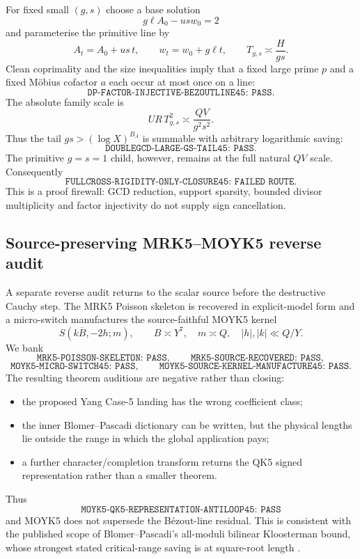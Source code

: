 \documentclass[11pt]{article}
\theoremstyle{definition}
\newcommand{\1}{\mathbf 1}
\begin{document}
For fixed small $(g,s)$ choose a base solution
\[
 g\ell A_0-usw_0=2
\]
and parameterise the primitive line by
\[
 A_t=A_0+us\,t,\qquad
 w_t=w_0+g\ell t,\qquad
 T_{g,s}\asymp \frac{H}{gs}.
\]
Clean coprimality and the size inequalities imply that a fixed large prime
$p$ and a fixed M\"obius cofactor $a$ each occur at most once on a line:
\[
 \boxed{\texttt{DP-FACTOR-INJECTIVE-BEZOUTLINE45: PASS}}.
\]
The absolute family scale is
\[
 UR\,T_{g,s}^2\asymp \frac{QV}{g^2s^2}.
\]
Thus the tail $gs>(\log X)^{B_A}$ is summable with arbitrary logarithmic
saving:
\[
 \boxed{\texttt{DOUBLEGCD-LARGE-GS-TAIL45: PASS}}.
\]
The primitive $g=s=1$ child, however, remains at the full natural $QV$ scale.
Consequently
\[
 \boxed{\texttt{FULLCROSS-RIGIDITY-ONLY-CLOSURE45: FAILED ROUTE}}.
\]
This is a proof firewall: GCD reduction, support sparsity, bounded divisor
multiplicity and factor injectivity do not supply sign cancellation.

\subsection{Source-preserving MRK5--MOYK5 reverse audit}
A separate reverse audit returns to the scalar source before the destructive
Cauchy step.  The MRK5 Poisson skeleton is recovered in explicit-model form
and a micro-switch manufactures the source-faithful MOYK5 kernel
\[
 \boxed{S(k\overline B,-2h;m)},
 \qquad
 B\asymp Y^7,\quad m\asymp Q,\quad |h|,|k|\ll Q/Y.
\]
We bank
\[
 \boxed{\texttt{MRK5-POISSON-SKELETON: PASS}},
 \qquad
 \boxed{\texttt{MRK5-SOURCE-RECOVERED: PASS}},
\]
\[
 \boxed{\texttt{MOYK5-MICRO-SWITCH45: PASS}},
 \qquad
 \boxed{\texttt{MOYK5-SOURCE-KERNEL-MANUFACTURE45: PASS}}.
\]
The resulting theorem auditions are negative rather than closing:
\begin{itemize}
 \item the proposed Yang Case-5 landing has the wrong coefficient class;
 \item the inner Blomer--Pascadi dictionary can be written, but the physical
       lengths lie outside the range in which the global application pays;
 \item a further character/completion transform returns the QK5 signed
       representation rather than a smaller theorem.
\end{itemize}
Thus
\[
 \boxed{\texttt{MOYK5-QK5-REPRESENTATION-ANTILOOP45: PASS}}
\]
and MOYK5 does not supersede the B\'ezout-line residual.  This is consistent
with the published scope of Blomer--Pascadi's all-moduli bilinear Kloosterman
bound, whose strongest stated critical-range saving is at square-root length
\cite{BlomerPascadi2026}.
\end{document}
